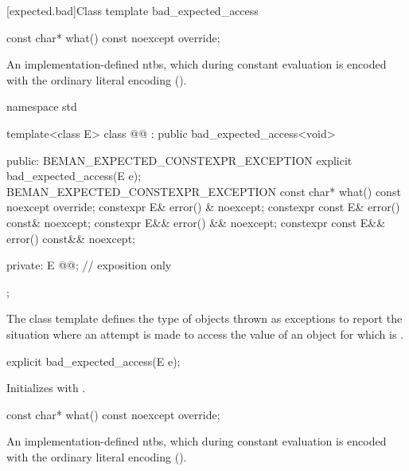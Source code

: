 [expected.bad]{Class template bad_expected_access}

%
\begin{itemdecl}
const char* what() const noexcept override;
\end{itemdecl}

\begin{itemdescr}
\pnum
\returns
An implementation-defined ntbs, which during constant evaluation is encoded with the ordinary literal encoding ().
\end{itemdescr}

\begin{codeblock}
namespace std {
  template<class E>
  class @@ : public bad_expected_access<void> {
  public:
    BEMAN_EXPECTED_CONSTEXPR_EXCEPTION explicit bad_expected_access(E e);
    BEMAN_EXPECTED_CONSTEXPR_EXCEPTION const char* what() const noexcept override;
    constexpr E& error() & noexcept;
    constexpr const E& error() const& noexcept;
    constexpr E&& error() && noexcept;
    constexpr const E&& error() const&& noexcept;

  private:
    E @@; // exposition only
  };
}
\end{codeblock}

\begin{itemdescr}
\pnum
\remarks
The class template  defines the type of objects thrown as exceptions to report the situation where an attempt is made to access the value of an  object for which  is .
\end{itemdescr}

%
\begin{itemdecl}
explicit bad_expected_access(E e);
\end{itemdecl}

\begin{itemdescr}
\pnum
\effects
Initializes  with .
\end{itemdescr}

%
\begin{itemdecl}
const char* what() const noexcept override;
\end{itemdecl}

\begin{itemdescr}
\pnum
\returns
An implementation-defined ntbs, which during constant evaluation is encoded with the ordinary literal encoding ().
\end{itemdescr}

